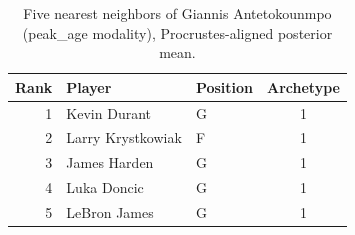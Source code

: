 \begin{table}[htbp]
  \centering\small
  \begin{tabular}{rllc}
    \toprule
    Rank & Player & Position & Archetype \\
    \midrule
    1 & Kevin Durant & G & 1 \\
    2 & Larry Krystkowiak & F & 1 \\
    3 & James Harden & G & 1 \\
    4 & Luka Doncic & G & 1 \\
    5 & LeBron James & G & 1 \\
    \bottomrule
  \end{tabular}
  \caption{Five nearest neighbors of Giannis Antetokounmpo (peak_age modality), Procrustes-aligned posterior mean.}
  \label{tab:Giannis_Antetokounmpo_neighbors_peak_age}
\end{table}


